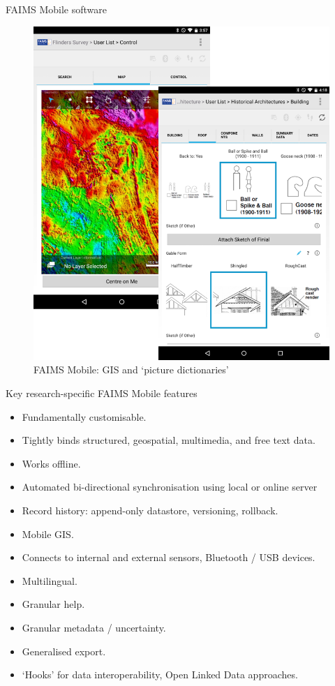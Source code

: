 \documentclass[aspectratio=169, 12pt]{beamer} %
\begin{document}
\begin{frame}{FAIMS Mobile software}
 \begin{figure}[H]
    \centering
        \includegraphics[height=.75\textheight]{figures/FAIMS-screenshots.png}
        \caption{FAIMS Mobile: GIS and `picture dictionaries'}
        \label{fig:figure10}
 \end{figure}
\end{frame}

\begin{frame}{Key research-specific FAIMS Mobile features}
    \begin{itemize}[label=\textbullet]
        \item Fundamentally customisable.
        \item Tightly binds structured, geospatial, multimedia, and free text data.
        \item Works offline.
        \item Automated bi-directional synchronisation using local or online server
        \item Record history: append-only datastore, versioning, rollback.
        \item Mobile GIS.
        \item Connects to internal and external sensors, Bluetooth / USB devices.
        \item Multilingual.
        \item Granular help.
        \item Granular metadata / uncertainty.
        \item Generalised export.
        \item `Hooks’ for data interoperability, Open Linked Data approaches.
    \end{itemize}
\end{frame}
\end{document}
